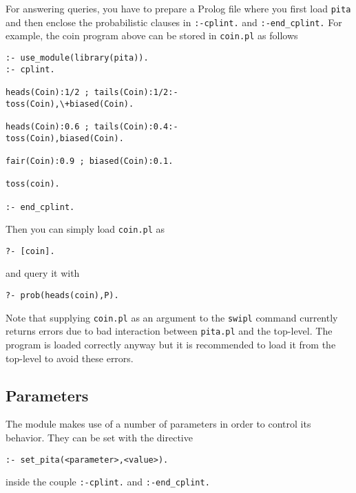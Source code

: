 \documentclass[a4paper,10pt]{article}
\begin{document}
For answering queries, you have to prepare a Prolog file where you first load \texttt{pita} and then enclose the probabilistic 
clauses in \texttt{:-cplint.} and \texttt{:-end\_cplint.} For example, the coin program above can be stored in \texttt{coin.pl} as follows
\begin{verbatim}
:- use_module(library(pita)).
:- cplint.

heads(Coin):1/2 ; tails(Coin):1/2:- 
toss(Coin),\+biased(Coin).

heads(Coin):0.6 ; tails(Coin):0.4:- 
toss(Coin),biased(Coin).

fair(Coin):0.9 ; biased(Coin):0.1.

toss(coin).

:- end_cplint.
\end{verbatim}
Then you can simply load \texttt{coin.pl} as
\begin{verbatim}
?- [coin].
\end{verbatim}
and query it with
\begin{verbatim}
?- prob(heads(coin),P).
\end{verbatim}
Note that supplying \texttt{coin.pl} as an argument to the \texttt{swipl} command currently returns errors due to bad interaction between \texttt{pita.pl} and the top-level.
The program is loaded correctly anyway but it is recommended to load it from the top-level to avoid these errors.



\subsection{Parameters}
The module makes use of a number of parameters in order to control its behavior. They can be set with the directive
\begin{verbatim}
:- set_pita(<parameter>,<value>).
\end{verbatim}
inside the couple \texttt{:-cplint.} and \texttt{:-end\_cplint.} 
\end{document}
